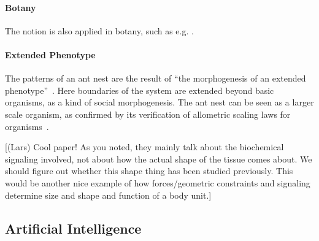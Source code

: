 \documentclass[fleqn,10pt]{wlscirep}
\begin{document}
\paragraph{Botany}

The notion is also applied in botany, such as e.g. \cite{lord1981cleistogamy}.

\paragraph{Extended Phenotype}

The patterns of an ant nest are the result of ``the morphogenesis of an extended phenotype''~\cite{minter2012morphogenesis}. Here boundaries of the system are extended beyond basic organisms, as a kind of social morphogenesis. The ant nest can be seen as a larger scale organism, as confirmed by its verification of allometric scaling laws for organisms~\cite{west1997general}.




[(Lars) Cool paper! As you noted, they mainly talk about the biochemical signaling involved, not about how the actual shape of the tissue comes about. We should figure out whether this shape thing has been studied previously. This would be another nice example of how forces/geometric constraints and signaling determine size and shape and function of a body unit.]





\subsection*{Artificial Intelligence}
\end{document}
